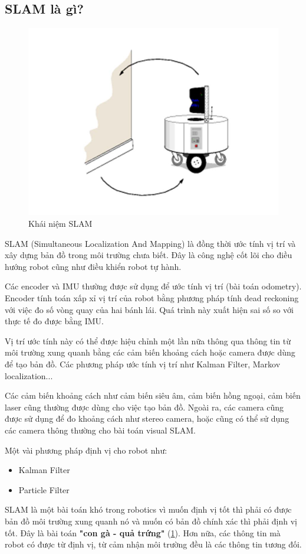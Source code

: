 \subsection{SLAM là gì?}
\begin{figure}[tph]
	\centering
	\includegraphics[width=0.7\linewidth]{chapter2/figs/slam}
	\caption{Khái niệm SLAM}
	\label{fig:slam}
\end{figure}
SLAM (Simultaneous Localization And Mapping) là đồng thời ước tính vị trí và xây dựng bản đồ trong môi trường chưa biết. Đây là công nghệ cốt lõi cho điều hướng robot cũng như điều khiển robot tự hành.

Các encoder và IMU thường được sử dụng để ước tính vị trí (bài toán odometry). Encoder tính toán xấp xỉ vị trí của robot bằng phương pháp tính dead reckoning với việc đo số vòng quay của hai bánh lái. Quá trình này xuất hiện sai số so với thực tế đo được bằng IMU. 

Vị trí ước tính này có thể được hiệu chỉnh một lần nữa  thông qua thông tin từ môi trường xung quanh bằng các cảm biến khoảng cách hoặc camera được dùng để tạo bản đồ. Các phương pháp ước tính vị trí như Kalman Filter, Markov localization...

Các cảm biến khoảng cách như cảm biến siêu âm, cảm biến hồng ngoại, cảm biến laser cũng thường được dùng cho việc tạo bản đồ. Ngoài ra, các camera cũng được sử dụng để đo khoảng cách như stereo camera, hoặc cũng có thể sử dụng các camera thông thường cho bài toán visual SLAM.

Một vài phương pháp định vị cho robot như:
\begin{itemize}
	\item Kalman Filter
	\item Particle Filter
\end{itemize}

SLAM là một bài toán khó trong robotics vì muốn định vị tốt thì phải có được bản đồ môi trường xung quanh nó và muốn có bản đồ chính xác thì phải định vị tốt. Đây là bài toán \textbf{"con gà - quả trứng"} (\figurename{\ref{fig:slam}}). Hơn nữa, các thông tin mà robot có được từ định vị, từ cảm nhận môi trường đều là các thông tin tương đối.

